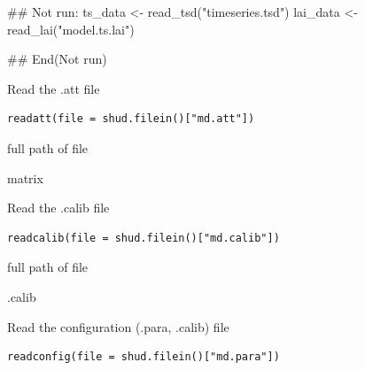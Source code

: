 \documentclass[a4paper]{book}
\begin{document}
%
\begin{Examples}
\begin{ExampleCode}
## Not run: 
ts_data <- read_tsd("timeseries.tsd")
lai_data <- read_lai("model.ts.lai")

## End(Not run)
\end{ExampleCode}
\end{Examples}
%
\begin{Description}\relax
Read the .att file
\end{Description}
%
\begin{Usage}
\begin{verbatim}
readatt(file = shud.filein()["md.att"])
\end{verbatim}
\end{Usage}
%
\begin{Arguments}
\begin{ldescription}
\item[\code{file}] full path of file
\end{ldescription}
\end{Arguments}
%
\begin{Value}
matrix
\end{Value}
%
\begin{Description}\relax
Read the .calib file
\end{Description}
%
\begin{Usage}
\begin{verbatim}
readcalib(file = shud.filein()["md.calib"])
\end{verbatim}
\end{Usage}
%
\begin{Arguments}
\begin{ldescription}
\item[\code{file}] full path of file
\end{ldescription}
\end{Arguments}
%
\begin{Value}
.calib
\end{Value}
%
\begin{Description}\relax
Read the configuration (.para, .calib) file
\end{Description}
%
\begin{Usage}
\begin{verbatim}
readconfig(file = shud.filein()["md.para"])
\end{verbatim}
\end{Usage}
\end{document}
